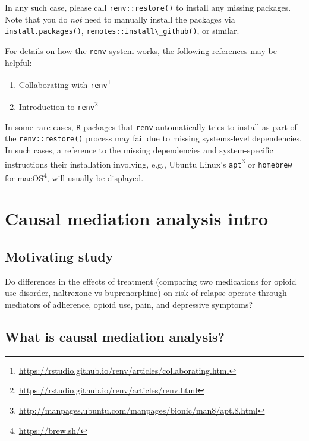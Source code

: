 \documentclass[
  12pt,
]{book}
\newcommand{\passthrough}[1]{#1}
\providecommand{\tightlist}{%
  \setlength{\itemsep}{0pt}\setlength{\parskip}{0pt}}
\renewcommand{\href}[2]{#2\footnote{\url{#1}}}
\theoremstyle{definition}
\theoremstyle{definition}
\theoremstyle{definition}
\newcommand{\1}{\mathbbm{1}}
\begin{document}
In any such case, please call \passthrough{\lstinline!renv::restore()!} to install any missing packages.
Note that you do \emph{not} need to manually install the packages via
\passthrough{\lstinline!install.packages()!}, \passthrough{\lstinline!remotes::install\_github()!}, or similar.

For details on how the \passthrough{\lstinline!renv!} system works, the following references may be
helpful:

\begin{enumerate}
\def\labelenumi{\arabic{enumi}.}
\tightlist
\item
  \href{https://rstudio.github.io/renv/articles/collaborating.html}{Collaborating with
  \passthrough{\lstinline!renv!}}
\item
  \href{https://rstudio.github.io/renv/articles/renv.html}{Introduction to \passthrough{\lstinline!renv!}}
\end{enumerate}

In some rare cases, \passthrough{\lstinline!R!} packages that \passthrough{\lstinline!renv!} automatically tries to install as
part of the \passthrough{\lstinline!renv::restore()!} process may fail due to missing systems-level
dependencies. In such cases, a reference to the missing dependencies and
system-specific instructions their installation involving, e.g., \href{http://manpages.ubuntu.com/manpages/bionic/man8/apt.8.html}{Ubuntu
Linux's \passthrough{\lstinline!apt!}} or
\href{https://brew.sh/}{\passthrough{\lstinline!homebrew!} for macOS}, will usually be displayed.

\hypertarget{mediation}{%
\chapter{Causal mediation analysis intro}\label{mediation}}

\hypertarget{motivating-study}{%
\section{Motivating study}\label{motivating-study}}

Do differences in the effects of treatment (comparing two medications for opioid
use disorder, naltrexone vs buprenorphine) on risk of relapse operate through
mediators of adherence, opioid use, pain, and depressive symptoms?
\citep{rudolph2020explaining}

\hypertarget{what-is-causal-mediation-analysis}{%
\section{What is causal mediation analysis?}\label{what-is-causal-mediation-analysis}}
\end{document}
